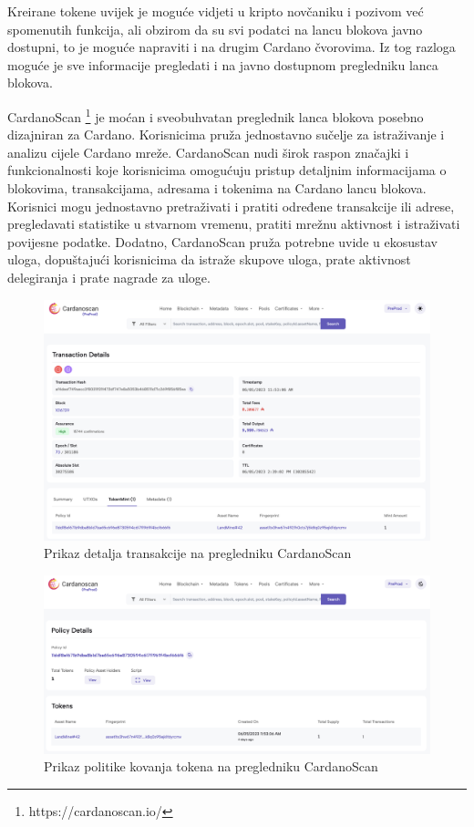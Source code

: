 \documentclass[times, utf8, diplomski]{fer}
\begin{document}

Kreirane tokene uvijek je moguće vidjeti u kripto novčaniku i pozivom već spomenutih funkcija, ali obzirom da su svi podatci na lancu blokova javno dostupni, to je moguće napraviti i na drugim Cardano čvorovima. Iz tog razloga moguće je sve informacije pregledati i na javno dostupnom pregledniku lanca blokova.

CardanoScan \footnote{https://cardanoscan.io/} je moćan i sveobuhvatan preglednik lanca blokova posebno dizajniran za Cardano. Korisnicima pruža jednostavno sučelje za istraživanje i analizu cijele Cardano mreže. CardanoScan nudi širok raspon značajki i funkcionalnosti koje korisnicima omogućuju pristup detaljnim informacijama o blokovima, transakcijama, adresama i tokenima na Cardano lancu blokova. Korisnici mogu jednostavno pretraživati i pratiti određene transakcije ili adrese, pregledavati statistike u stvarnom vremenu, pratiti mrežnu aktivnost i istraživati povijesne podatke. Dodatno, CardanoScan pruža potrebne uvide u ekosustav uloga, dopuštajući korisnicima da istraže skupove uloga, prate aktivnost delegiranja i prate nagrade za uloge.

\begin{figure}[htb]
\centering
\includegraphics[width=\linewidth]{img/result-transaction.png}
\caption{Prikaz detalja transakcije na pregledniku CardanoScan}
\label{fig:result-transaction}
\end{figure}

\begin{figure}[htb]
\centering
\includegraphics[width=\linewidth]{img/result-policy.png}
\caption{Prikaz politike kovanja tokena na pregledniku CardanoScan}
\label{fig:result-policy}
\end{figure}
\end{document}
